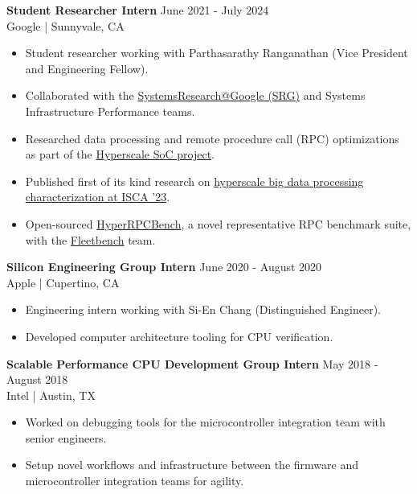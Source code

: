 \documentclass[line]{res}
\begin{document}
\begin{resume}
\textbf{Student Researcher Intern} \hfill June 2021 - July 2024
\\
Google | Sunnyvale, CA
\\
\vspace{-3mm}
\begin{itemize}
\item Student researcher working with Parthasarathy Ranganathan (Vice President and Engineering Fellow).
\item Collaborated with the \href{https://techsysinfra.google/research/}{SystemsResearch@Google (SRG)} and Systems Infrastructure Performance teams.
\item Researched data processing and remote procedure call (RPC) optimizations as part of the \hyperref[sec:hyperscale-soc]{Hyperscale SoC project}.
\item Published first of its kind research on \href{https://dl.acm.org/doi/10.1145/3579371.3589082}{hyperscale big data processing characterization at ISCA '23}.
\item Open-sourced \href{https://github.com/google/fleetbench/tree/cd20746b68b307b148a761c676d6400f2541082d/fleetbench/rpc}{HyperRPCBench}, a novel representative RPC benchmark suite, with the \href{https://github.com/google/fleetbench}{Fleetbench} team.
\end{itemize}

\vspace{-3mm}

\textbf{Silicon Engineering Group Intern} \hfill June 2020 - August 2020
\\
Apple | Cupertino, CA
\\
\vspace{-3mm}
\begin{itemize}
\item Engineering intern working with Si-En Chang (Distinguished Engineer).
\item Developed computer architecture tooling for CPU verification.
\end{itemize}

\vspace{-3mm}

\textbf{Scalable Performance CPU Development Group Intern} \hfill May 2018 - August 2018
\\
Intel | Austin, TX
\\
\vspace{-3mm}
\begin{itemize}
\item Worked on debugging tools for the microcontroller integration team with senior engineers.
\item Setup novel workflows and infrastructure between the firmware and microcontroller integration teams for agility.
\end{itemize}


\end{resume}
\end{document}
